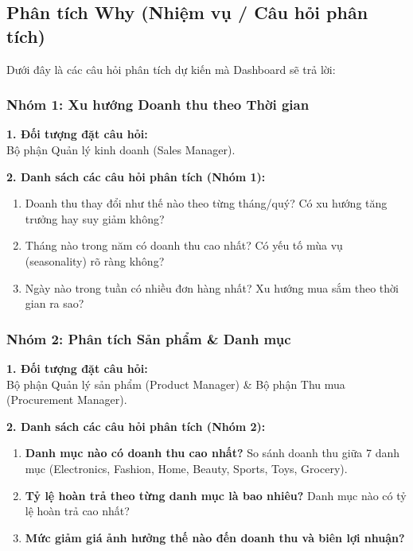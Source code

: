 \subsection{Phân tích Why (Nhiệm vụ / Câu hỏi phân tích)}

Dưới đây là các câu hỏi phân tích dự kiến mà Dashboard sẽ trả lời:

\subsubsection{Nhóm 1: Xu hướng Doanh thu theo Thời gian}
\noindent\textbf{1. Đối tượng đặt câu hỏi:} \\
Bộ phận Quản lý kinh doanh (Sales Manager).

\vspace{0.3cm}
\noindent\textbf{2. Danh sách các câu hỏi phân tích (Nhóm 1):}
\begin{enumerate}[label=(\alph*)]
    \item Doanh thu thay đổi như thế nào theo từng tháng/quý? Có xu hướng tăng trưởng hay suy giảm không?
    \item Tháng nào trong năm có doanh thu cao nhất? Có yếu tố mùa vụ (seasonality) rõ ràng không?
    \item Ngày nào trong tuần có nhiều đơn hàng nhất? Xu hướng mua sắm theo thời gian ra sao?
\end{enumerate}



\subsubsection{Nhóm 2: Phân tích Sản phẩm \& Danh mục}
\noindent\textbf{1. Đối tượng đặt câu hỏi:} \\
Bộ phận Quản lý sản phẩm (Product Manager) \& Bộ phận Thu mua (Procurement Manager).

\vspace{0.3cm}
\noindent\textbf{2. Danh sách các câu hỏi phân tích (Nhóm 2):}
\begin{enumerate}[label=(\alph*)]
    \item \textbf{Danh mục nào có doanh thu cao nhất?} So sánh doanh thu giữa 7 danh mục (Electronics, Fashion, Home, Beauty, Sports, Toys, Grocery).
    \item \textbf{Tỷ lệ hoàn trả theo từng danh mục là bao nhiêu?} Danh mục nào có tỷ lệ hoàn trả cao nhất?
    \item \textbf{Mức giảm giá ảnh hưởng thế nào đến doanh thu và biên lợi nhuận?}
\end{enumerate}

